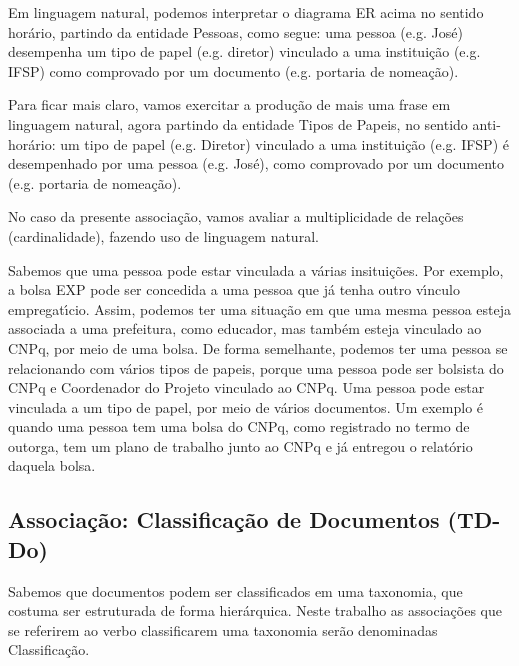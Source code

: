 \documentclass[
12pt,		%
openright,	%
twoside,  %
a4paper,			%
chapter=TITLE,		%
english,			%
french,				%
spanish,			%
brazil				%
]{USPSC-classe/USPSC}
\begin{document}
Em linguagem natural, podemos interpretar o diagrama ER acima no sentido hor\'ario, partindo da entidade \textquotedbl Pessoas\textquotedbl , como segue: uma pessoa (e.g. Jos\'e) desempenha um tipo de papel (e.g. diretor) vinculado a uma institui\c{c}\~ao (e.g. IFSP) como comprovado por um documento (e.g. portaria de nomea\c{c}\~ao).




Para ficar mais claro, vamos exercitar a produ\c{c}\~ao de mais uma frase em linguagem natural, agora partindo da entidade \textquotedbl Tipos de Papeis\textquotedbl , no sentido anti-hor\'ario: um tipo de papel (e.g. Diretor) vinculado a uma institui\c{c}\~ao (e.g. IFSP) \'e desempenhado por uma pessoa (e.g. Jos\'e), como comprovado por um documento (e.g. portaria de nomea\c{c}\~ao).




No caso da presente associa\c{c}\~ao, vamos avaliar a multiplicidade de rela\c{c}\~oes (cardinalidade), fazendo uso de linguagem natural.




Sabemos que uma pessoa pode estar vinculada a v\'arias insitui\c{c}\~oes. Por exemplo, a bolsa EXP pode ser concedida a uma pessoa que j\'a tenha outro v\'{\i}nculo empregat\'{\i}cio. Assim, podemos ter uma situa\c{c}\~ao em que uma mesma pessoa esteja associada a uma prefeitura, como educador, mas tamb\'em esteja vinculado ao CNPq, por meio de uma bolsa. De forma semelhante, podemos ter uma pessoa se relacionando com v\'arios tipos de papeis, porque uma pessoa pode ser bolsista do CNPq e Coordenador do Projeto vinculado ao CNPq. Uma pessoa pode estar vinculada a um tipo de papel, por meio de v\'arios documentos. Um exemplo \'e quando uma pessoa tem uma bolsa do CNPq, como registrado no termo de outorga, tem um plano de trabalho junto ao CNPq e j\'a entregou o relat\'orio daquela bolsa.




\subsection[Associa\c{c}\~ao: Classifica\c{c}\~ao de Documentos (TD-Do)]{Associa\c{c}\~ao: Classifica\c{c}\~ao de Documentos (TD-Do)}\label{Associa\c{c}\~ao: Classifica\c{c}\~ao de Documentos (TD-Do)}
Sabemos que documentos podem ser classificados em uma taxonomia, que costuma ser estruturada de forma hier\'arquica. Neste trabalho as associa\c{c}\~oes que se referirem ao verbo \textquotedbl classificar\textquotedbl  em uma taxonomia ser\~ao denominadas \textquotedbl Classifica\c{c}\~ao\textquotedbl .
\end{document}

